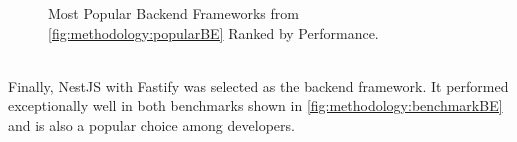 \clearpage
\begin{figure}[htbp] \ContinuedFloat
  \myfloatalign
   \caption{Most Popular Backend Frameworks from \autoref{fig:methodology:popularBE} Ranked by Performance.}
   \label{fig:methodology:benchmarkBE}
\end{figure}
~\\
Finally, NestJS \cite{methodology:nestjs} with Fastify was selected as the backend framework. It performed exceptionally well in both benchmarks shown in \autoref{fig:methodology:benchmarkBE} and is also a popular choice among developers.

